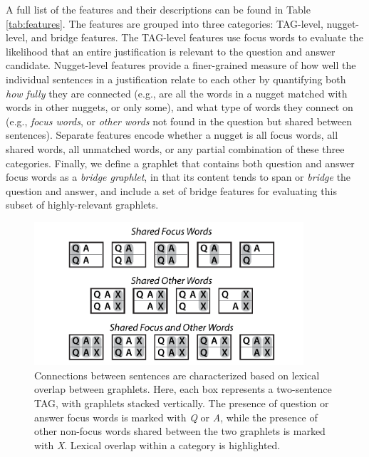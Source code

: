 A full list of the features and their descriptions can be found in Table \ref{tab:features}.
%
The features are grouped into three categories: TAG-level, nugget-level, and bridge features. 
The TAG-level features use focus words to evaluate the likelihood that an entire justification is relevant to the question and answer candidate. 
Nugget-level features provide a finer-grained measure of how well the individual sentences in a justification relate to each other by quantifying both \emph{how fully} they are connected (e.g., are all the words in a nugget matched with words in other nuggets, or only some), and what type of words they connect on (e.g., \emph{focus words}, or \emph{other words} not found in the question but shared between sentences).
Separate features encode whether a nugget is all focus words, all shared words, all unmatched words, or any partial combination of these three categories.
Finally, we define a graphlet that contains both question and answer focus words as a \emph{bridge graphlet}, in that its content tends to span or \emph{bridge} the question and answer, and include a set of bridge features for evaluating this subset of highly-relevant graphlets. 




\begin{figure}[t!]
\begin{center}
\includegraphics[width=100mm]{mainmatter/tacl2015-tig/connection_types.pdf}
\caption{{Connections between sentences are characterized based on lexical overlap between graphlets.
Here, each box represents a two-sentence TAG, with graphlets stacked vertically.  The presence of question or answer focus words is marked with \emph{Q} or \emph{A}, while the presence of other non-focus words shared between the two graphlets is marked with \emph{X}.  Lexical overlap within a category is highlighted.
}}
\label{fig:connectiontypes}
\end{center}
\end{figure}


